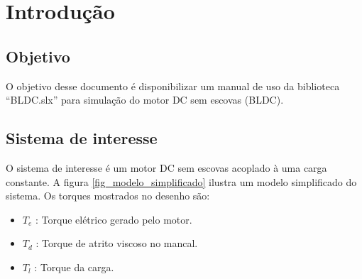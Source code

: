 \maketitle
\tableofcontents
\begin{versionhistory}
\end{versionhistory}



\chapter{Introdução}

    \section{Objetivo}
        O objetivo desse documento é disponibilizar um manual de uso da biblioteca ``BLDC.slx'' para simulação do motor DC sem escovas (BLDC).

    \section{Sistema de interesse}
        O sistema de interesse é um motor DC sem escovas acoplado à uma carga constante. A figura \ref{fig_modelo_simplificado} ilustra um modelo simplificado do sistema. Os torques mostrados no desenho são:
        \begin{itemize}
            \item $T_e$ : Torque elétrico gerado pelo motor.
            \item $T_d$ : Torque de atrito viscoso no mancal.
            \item $T_l$ : Torque da carga.
        \end{itemize}


